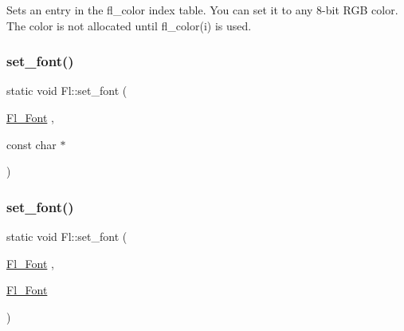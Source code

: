 Sets an entry in the fl\+\_\+color index table. You can set it to any 8-\/bit R\+GB color. The color is not allocated until fl\+\_\+color(i) is used. \mbox{\label{group__fl__attributes_gac8bc23064aae455f7e5649240cf66b6d}} 
\subsubsection{\texorpdfstring{set\+\_\+font()}{set\_font()}\hspace{0.1cm}{\footnotesize\ttfamily [1/2]}}
{\footnotesize\ttfamily static void Fl\+::set\+\_\+font (\begin{DoxyParamCaption}\item[{\hyperlink{_enumerations_8_h_a2ac46d9f082834b969fffe490a03a709}{Fl\+\_\+\+Font}}]{,  }\item[{const char $\ast$}]{ }\end{DoxyParamCaption})\hspace{0.3cm}{\ttfamily [static]}}

\mbox{\label{group__fl__attributes_ga229f381b4ccf634ad83bd5ad4b428ea1}} 
\subsubsection{\texorpdfstring{set\+\_\+font()}{set\_font()}\hspace{0.1cm}{\footnotesize\ttfamily [2/2]}}
{\footnotesize\ttfamily static void Fl\+::set\+\_\+font (\begin{DoxyParamCaption}\item[{\hyperlink{_enumerations_8_h_a2ac46d9f082834b969fffe490a03a709}{Fl\+\_\+\+Font}}]{,  }\item[{\hyperlink{_enumerations_8_h_a2ac46d9f082834b969fffe490a03a709}{Fl\+\_\+\+Font}}]{ }\end{DoxyParamCaption})\hspace{0.3cm}{\ttfamily [static]}}

\mbox{\label{group__fl__attributes_gaacc901040c27daf45117a3691d0ab03a}} 
